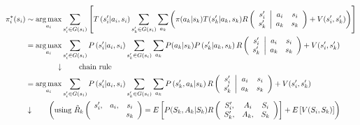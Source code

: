\begin{align*}
  \pi^\ast_i( s_i )
& \sim \argmax_{a_i} \sum_{s_i^\prime \in G( s_i )}
  \left[
      T\left( s^\prime_i \middle| a_i, s_i \right)
      \sum_{s^\prime_k \in G( s_i )} \sum_{a_k}
        \left(
           \pi( a_k | s_k ) T( s^\prime_k | a_k, s_k )
           R\left(
               \begin{array}{c} s^\prime_i \\ s^\prime_k  \end{array}
            \middle|
               \begin{array}{cc} a_i & s_i \\ a_k & s_k \end{array}   
               \right)
          + V( s^\prime_i, s^\prime_k )    
        \right)
  \right] \\
& = \argmax_{a_i} \sum_{s_i^\prime \in G( s_i )} P\left( s^\prime_i \middle| a_i, s_i  \right) \sum_{s^\prime_k \in G( s_i )} \sum_{a_k} P( a_k | s_k ) P\left( s^\prime_k \middle| a_k, s_k \right)  R\left(
               \begin{array}{c} s^\prime_i \\ s^\prime_k  \end{array}
            \middle|
               \begin{array}{cc} a_i & s_i \\ a_k & s_k \end{array}   
               \right)
               + V( s^\prime_i, s^\prime_k ) \\
& \qquad\qquad \downarrow \qquad \text{chain\ rule} \\               
& = \argmax_{a_i} \sum_{s_i^\prime \in G( s_i )} P\left( s^\prime_i \middle| a_i, s_i  \right) \sum_{s^\prime_k \in G( s_i )} \sum_{a_k} P\left( s^\prime_k, a_k \middle| s_k \right)  R\left(
               \begin{array}{c} s^\prime_i \\ s^\prime_k  \end{array}
            \middle|
               \begin{array}{cc} a_i & s_i \\ a_k & s_k \end{array}   
               \right)
               + V( s^\prime_i, s^\prime_k ) \\              
& \downarrow \qquad \left( \text{using\ }
               \tilde{R}_k \left( \begin{array}{ccc} s^\prime_i, & a_i, & s_i \\ & & s_k  \end{array} \right) = E\left[ P( S_k, A_k | S_k ) R\left( \begin{array}{ccc} S^\prime_i, & A_i & S_i \\ S^\prime_k, & A_k, & S_k\end{array} \right) \right] + E\left[ V( S_i, S_k ) \right] \right) \\

\end{align*}
